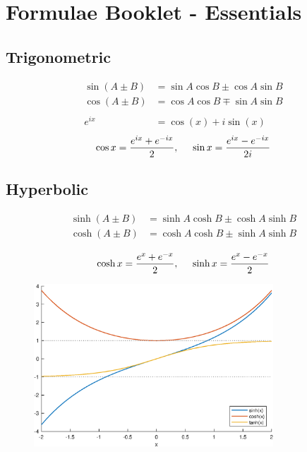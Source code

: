 \documentclass[a4paper,12pt]{article}
\begin{document}
\section*{Formulae Booklet - Essentials}
\subsection*{Trigonometric}
\begin{equation*}
  \begin{split}
    \sin(A \pm B) &= \sin{A}\cos{B}\pm\cos{A}\sin{B}\\
    \cos(A \pm B) &= \cos{A}\cos{B}\mp\sin{A}\sin{B}\\\\
    e^{ix} &= \cos(x) + i\sin(x)
  \end{split}
\end{equation*}
$$\cos{x} = \frac{e^{ix} + e^{-ix}}{2},\hspace{5mm}\sin{x} = \frac{e^{ix} - e^{-ix}}{2i}$$

\subsection*{Hyperbolic}
\begin{equation*}
  \begin{split}
    \sinh(A \pm B) &= \sinh{A}\cosh{B}\pm\cosh{A}\sinh{B}\\
    \cosh(A \pm B) &= \cosh{A}\cosh{B}\pm\sinh{A}\sinh{B}\\
  \end{split}
\end{equation*}
$$\cosh{x} = \frac{e^x+e^{-x}}{2} ,\hspace{5mm}\sinh{x} = \frac{e^x-e^{-x}}{2}$$
\begin{figure}[h]
  \includegraphics[width=0.8\textwidth]{hyperbolic_figures.eps}
  \centering
\end{figure}
\end{document}
